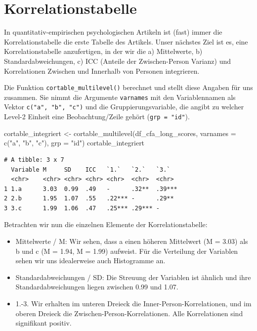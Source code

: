 \documentclass[
  letterpaper,
  DIV=11,
  numbers=noendperiod]{scrreprt}
\newenvironment{Shaded}{\begin{snugshade}}{\end{snugshade}}
\newcommand{\AttributeTok}[1]{\textcolor[rgb]{0.40,0.45,0.13}{#1}}
\newcommand{\FunctionTok}[1]{\textcolor[rgb]{0.28,0.35,0.67}{#1}}
\newcommand{\NormalTok}[1]{\textcolor[rgb]{0.00,0.23,0.31}{#1}}
\newcommand{\OtherTok}[1]{\textcolor[rgb]{0.00,0.23,0.31}{#1}}
\newcommand{\StringTok}[1]{\textcolor[rgb]{0.13,0.47,0.30}{#1}}
\providecommand{\tightlist}{%
  \setlength{\itemsep}{0pt}\setlength{\parskip}{0pt}}\usepackage{longtable,booktabs,array}
\begin{document}
\section{Korrelationstabelle}\label{korrelationstabelle}

In quantitativ-empirischen psychologischen Artikeln ist (fast) immer die
Korrelationstabelle die erste Tabelle des Artikels. Unser nächstes Ziel
ist es, eine Korrelationstabelle anzufertigen, in der wir die a)
Mittelwerte, b) Standardabweichungen, c) ICC (Anteile der
Zwischen-Person Varianz) und Korrelationen Zwischen und Innerhalb von
Personen integrieren.

Die Funktion \texttt{cortable\_multilevel()} berechnet und stellt diese
Angaben für uns zusammen. Sie nimmt die Argumente \texttt{varnames} mit
den Variablennamen als Vektor \texttt{c("a",\ "b",\ "c")} und die
Gruppierungsvariable, die angibt zu welcher Level-2 Einheit eine
Beobachtung/Zeile gehört (\texttt{grp\ =\ "id"}).

\begin{Shaded}
\begin{Highlighting}[]
\NormalTok{cortable\_integriert }\OtherTok{\textless{}{-}} \FunctionTok{cortable\_multilevel}\NormalTok{(df\_cfa\_long\_scores,}
                                           \AttributeTok{varnames =} \FunctionTok{c}\NormalTok{(}\StringTok{"a"}\NormalTok{, }\StringTok{"b"}\NormalTok{, }\StringTok{"c"}\NormalTok{),}
                                           \AttributeTok{grp =} \StringTok{"id"}\NormalTok{)}
\NormalTok{cortable\_integriert}
\end{Highlighting}
\end{Shaded}

\begin{verbatim}
# A tibble: 3 x 7
  Variable M     SD    ICC   `1.`   `2.`   `3.`  
  <chr>    <chr> <chr> <chr> <chr>  <chr>  <chr> 
1 1.a      3.03  0.99  .49   -      .32**  .39***
2 2.b      1.95  1.07  .55   .22*** -      .29** 
3 3.c      1.99  1.06  .47   .25*** .29*** -     
\end{verbatim}

Betrachten wir nun die einzelnen Elemente der Korrelationstabelle:

\begin{itemize}
\tightlist
\item
  Mittelwerte / M: Wir sehen, dass a einen höheren Mittelwert (M = 3.03)
  als b und c (M = 1.94, M = 1.99) aufweist. Für die Verteilung der
  Variablen sehen wir uns idealerweise auch Histogramme an.
\item
  Standardabweichungen / SD: Die Streuung der Variablen ist ähnlich und
  ihre Standardabweichungen liegen zwischen 0.99 und 1.07.
\item
  1.-3. Wir erhalten im unteren Dreieck die Inner-Person-Korrelationen,
  und im oberen Dreieck die Zwischen-Person-Korrelationen. Alle
  Korrelationen sind signifikant positiv.
\end{itemize}
\end{document}
